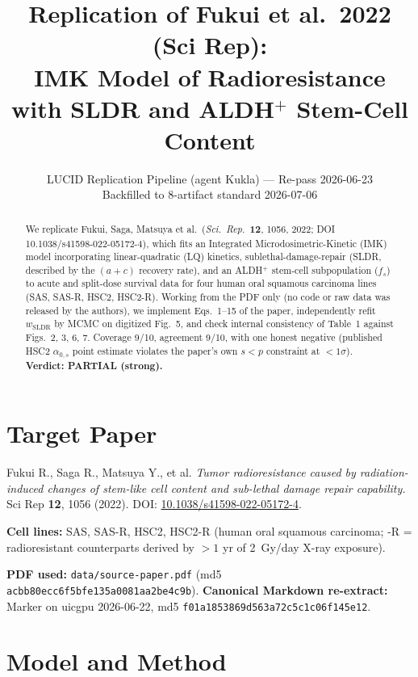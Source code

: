 \documentclass[11pt]{article}
\title{Replication of Fukui et al.\ 2022 (Sci Rep):\\
IMK Model of Radioresistance with SLDR and ALDH$^{+}$ Stem-Cell Content}
\author{LUCID Replication Pipeline (agent Kukla) --- Re-pass 2026-06-23\\
Backfilled to 8-artifact standard 2026-07-06}
\date{}
\begin{document}
\maketitle

\begin{abstract}
We replicate Fukui, Saga, Matsuya et al.\ (\emph{Sci.\ Rep.}\ \textbf{12}, 1056, 2022;
DOI 10.1038/s41598-022-05172-4), which fits an Integrated Microdosimetric-Kinetic (IMK) model
incorporating linear-quadratic (LQ) kinetics, sublethal-damage-repair (SLDR, described by the
$(a+c)$ recovery rate), and an ALDH$^{+}$ stem-cell subpopulation ($f_s$) to acute and split-dose
survival data for four human oral squamous carcinoma lines (SAS, SAS-R, HSC2, HSC2-R). Working from
the PDF only (no code or raw data was released by the authors), we implement Eqs.~1--15 of the paper,
independently refit $w_{\mathrm{SLDR}}$ by MCMC on digitized Fig.~5, and check internal consistency
of Table~1 against Figs.~2, 3, 6, 7. Coverage 9/10, agreement 9/10, with one honest negative
(published HSC2 $\alpha_{0,s}$ point estimate violates the paper's own $s < p$ constraint at $<1\sigma$).
\textbf{Verdict: PARTIAL (strong).}
\end{abstract}

\section{Target Paper}

Fukui R., Saga R., Matsuya Y., et al. \emph{Tumor radioresistance caused by radiation-induced changes
of stem-like cell content and sub-lethal damage repair capability.} Sci Rep \textbf{12}, 1056 (2022).
DOI: \href{https://doi.org/10.1038/s41598-022-05172-4}{10.1038/s41598-022-05172-4}.

\textbf{Cell lines:} SAS, SAS-R, HSC2, HSC2-R (human oral squamous carcinoma; -R = radioresistant
counterparts derived by $>1$ yr of 2~Gy/day X-ray exposure).

\textbf{PDF used:} \texttt{data/source-paper.pdf} (md5 \texttt{acbb80ecc6f5bfe135a0081aa2be4c9b}).
\textbf{Canonical Markdown re-extract:} Marker on uicgpu 2026-06-22, md5
\texttt{f01a1853869d563a72c5c1c06f145e12}.

\section{Model and Method}
\end{document}
